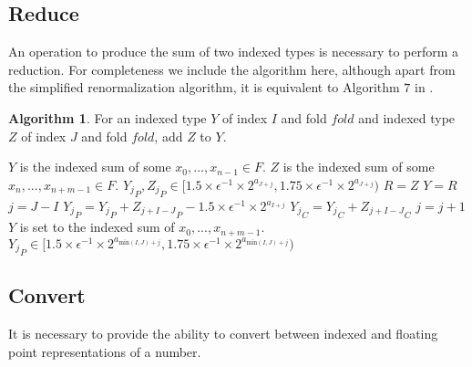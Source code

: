 \documentclass[12pt]{article}
\providecommand{\min}{\ensuremath{\text{min}}}
\theoremstyle{definition}
\newtheorem{alg}{Algorithm}[section]
\numberwithin{equation}{section}
\begin{document}
  \subsection{Reduce}
    \label{sec:basicops_reduce}
    An operation to produce the sum of two indexed types is necessary to perform a reduction. For completeness we include the algorithm here, although apart from the simplified renormalization algorithm, it is equivalent to Algorithm $7$ in \cite{repsum}.
    \begin{alg}
      For an indexed type $Y$ of index $I$ and fold $fold$ and indexed type $Z$ of index $J$ and fold $fold$, add $Z$ to $Y$.
      \begin{algorithmic}[1]
        \Ensure
          \Statex $Y$ is the indexed sum of some $x_0, ..., x_{n - 1} \in F$.
          \Statex $Z$ is the indexed sum of some $x_n, ..., x_{n + m - 1} \in F$.
          \Statex ${Y_j}_P, {Z_j}_P \in [1.5 \times \epsilon^{-1}\times 2^{a_{J + j}}, 1.75 \times \epsilon^{-1}\times 2^{a_{J + j}})$
          \State {}
          \State {}
            \State $R = Z$
            \State {}
            \State $Y = R$
          \EndIf
          \State $j = J - I$
            \State ${Y_{j}}_P = {Y_{j}}_P + {Z_{j + I - J}}_P - 1.5 \times \epsilon^{-1} \times 2^{a_{I + j}}$
            \State ${Y_{j}}_C = {Y_{j}}_C + {Z_{j + I - J}}_C$
            \State $j = j + 1$
          \EndWhile
          \State {}
        \EndFunction
        \Ensure
          \Statex $Y$ is set to the indexed sum of $x_0, ..., x_{n + m - 1}$.
          \Statex ${Y_j}_P \in [1.5 \times \epsilon^{-1}\times 2^{a_{\min(I, J) + j}}, 1.75 \times \epsilon^{-1}\times 2^{a_{\min(I, J) + j}})$
      \end{algorithmic}
      \label{alg:reduce}
    \end{alg}

  \subsection{Convert}
    \label{sec:basicops_convert}
    It is necessary to provide the ability to convert between indexed and floating point representations of a number.
\end{document}
